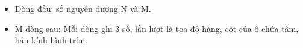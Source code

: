 \begin{itemize}
	\item     Dòng đầu: số nguyên dương N và M.   
\end{itemize}
\begin{itemize}
	\item     M dòng sau: Mỗi dòng ghi 3 số, lần lượt là tọa độ hàng, cột của ô chứa tâm, bán kính hình tròn.   
\end{itemize}